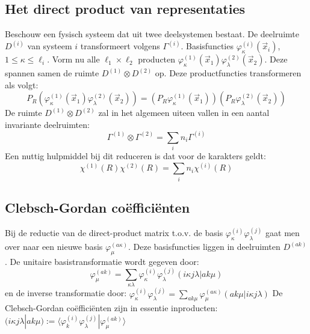 \subsection{Het direct product van representaties}
Beschouw een fysisch systeem dat uit twee deelsystemen bestaat. De deelruimte
$D^{(i)}$ van systeem $i$ transformeert volgens $\Gamma^{(i)}$. Basisfuncties
$\varphi^{(i)}_{\kappa}(\vec{x}_i)$, $1\leq\kappa\leq\ell_i$. Vorm nu alle
$\ell_1\times\ell_2$ producten $\varphi^{(1)}_{\kappa}(\vec{x}_1)\varphi^{(2)}_{\lambda}(\vec{x}_2)$.
Deze spannen samen de ruimte $D^{(1)}\otimes D^{(2)}$ op.
\npar
Deze productfuncties transformeren als volgt:
\[
P_R(\varphi^{(1)}_{\kappa}(\vec{x}_1)\varphi^{(2)}_{\lambda}(\vec{x}_2))=(P_R\varphi^{(1)}_{\kappa}(\vec{x}_1))(P_R\varphi^{(2)}_{\lambda}(\vec{x}_2))
\]
De ruimte $D^{(1)}\otimes D^{(2)}$ zal in het algemeen uiteen vallen in een
aantal invariante deelruimten:
\[
\Gamma^{(1)}\otimes\Gamma^{(2)}=\sum_i n_i\Gamma^{(i)}
\]
Een nuttig hulpmiddel bij dit reduceren is dat voor de karakters geldt:
\[
\chi^{(1)}(R)\chi^{(2)}(R)=\sum_i n_i\chi^{(i)}(R)
\]

\subsection{Clebsch-Gordan co\"effici\"enten}
Bij de reductie van de direct-product matrix t.o.v. de basis $\varphi_{\kappa}^{(i)}\varphi_{\lambda}^{(j)}$
gaat men over naar een nieuwe basis $\varphi_{\mu}^{(a\kappa)}$. Deze basisfuncties
liggen in deelruimten $D^{(ak)}$. De unitaire basistransformatie wordt gegeven
door:
\[
\varphi_{\mu}^{(ak)}=\sum_{\kappa\lambda}\varphi^{(i)}_{\kappa}\varphi^{(j)}_{\lambda}(i\kappa j\lambda|ak\mu)
\]
en de inverse transformatie door:
$\displaystyle\varphi^{(i)}_{\kappa}\varphi^{(j)}_{\lambda}=\sum_{ak\mu}\varphi_{\mu}^{(a\kappa)}(ak\mu|i\kappa j\lambda)$
\npar
De Clebsch-Gordan co\"effici\"enten zijn in essentie inproducten:
$(i\kappa j\lambda|ak\mu):=\langle\varphi_k^{(i)}\varphi_{\lambda}^{(j)}|\varphi_{\mu}^{(ak)}\rangle$

